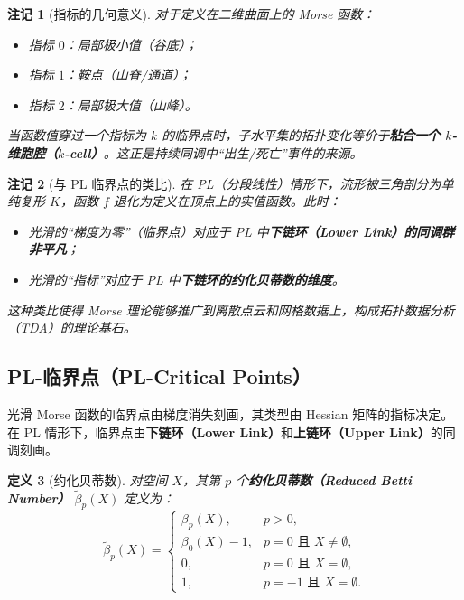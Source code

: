 \documentclass[UTF8]{ctexart}
\newtheorem{definition}{定义}[section]
\newtheorem{remark}[definition]{注记}
\begin{document}
\begin{remark}[指标的几何意义]
对于定义在二维曲面上的 Morse 函数：
\begin{itemize}
    \item 指标 \(0\)：局部极小值（谷底）；
    \item 指标 \(1\)：鞍点（山脊/通道）；
    \item 指标 \(2\)：局部极大值（山峰）。
\end{itemize}
当函数值穿过一个指标为 \(k\) 的临界点时，子水平集的拓扑变化等价于\textbf{粘合一个 \(k\)-维胞腔（\(k\)-cell）}。这正是持续同调中“出生/死亡”事件的来源。
\end{remark}

\begin{remark}[与 PL 临界点的类比]
在 PL（分段线性）情形下，流形被三角剖分为单纯复形 \(K\)，函数 \(f\) 退化为定义在顶点上的实值函数。此时：
\begin{itemize}
    \item 光滑的“梯度为零”（临界点）对应于 PL 中\textbf{下链环（Lower Link）的同调群非平凡}；
    \item 光滑的“指标”对应于 PL 中\textbf{下链环的约化贝蒂数的维度}。
\end{itemize}
这种类比使得 Morse 理论能够推广到离散点云和网格数据上，构成拓扑数据分析（TDA）的理论基石。
\end{remark}

\subsection{PL-临界点（PL-Critical Points）}
\label{subsec:pl-critical}

光滑 Morse 函数的临界点由梯度消失刻画，其类型由 Hessian 矩阵的指标决定。在 PL 情形下，临界点由\textbf{下链环（Lower Link）}和\textbf{上链环（Upper Link）}的同调刻画。

\begin{definition}[约化贝蒂数]
\label{def:reduced-betti}
对空间 \(X\)，其第 \(p\) 个\textbf{约化贝蒂数（Reduced Betti Number）} \(\tilde{\beta}_p(X)\) 定义为：
\[
\tilde{\beta}_p(X) = 
\begin{cases}
\beta_p(X), & p > 0,\\
\beta_0(X) - 1, & p = 0 \text{ 且 } X \neq \emptyset,\\
0, & p = 0 \text{ 且 } X = \emptyset,\\
1, & p = -1 \text{ 且 } X = \emptyset.
\end{cases}
\]
\end{definition}
\end{document}
